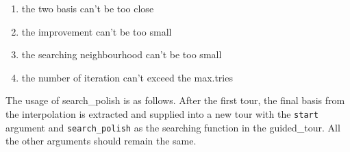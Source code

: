 \documentclass[12pt]{article}
\providecommand{\tightlist}{%
  \setlength{\itemsep}{0pt}\setlength{\parskip}{0pt}}
\newenvironment{Shaded}{\begin{snugshade}}{\end{snugshade}}
\newcommand{\DataTypeTok}[1]{\textcolor[rgb]{0.13,0.29,0.53}{#1}}
\newcommand{\DecValTok}[1]{\textcolor[rgb]{0.00,0.00,0.81}{#1}}
\newcommand{\KeywordTok}[1]{\textcolor[rgb]{0.13,0.29,0.53}{\textbf{#1}}}
\newcommand{\NormalTok}[1]{#1}
\newcommand{\OperatorTok}[1]{\textcolor[rgb]{0.81,0.36,0.00}{\textbf{#1}}}
\newcommand{\OtherTok}[1]{\textcolor[rgb]{0.56,0.35,0.01}{#1}}
\newcommand{\StringTok}[1]{\textcolor[rgb]{0.31,0.60,0.02}{#1}}
\begin{document}
\begin{enumerate}
\def\labelenumi{\arabic{enumi})}
\tightlist
\item
  the two basis can't be too close
\item
  the improvement can't be too small
\item
  the searching neighbourhood can't be too small
\item
  the number of iteration can't exceed the max.tries
\end{enumerate}

The usage of search\_polish is as follows. After the first tour, the
final basis from the interpolation is extracted and supplied into a new
tour with the \texttt{start} argument and \texttt{search\_polish} as the
searching function in the guided\_tour. All the other arguments should
remain the same.

\begin{Shaded}
\end{Shaded}
\end{document}
